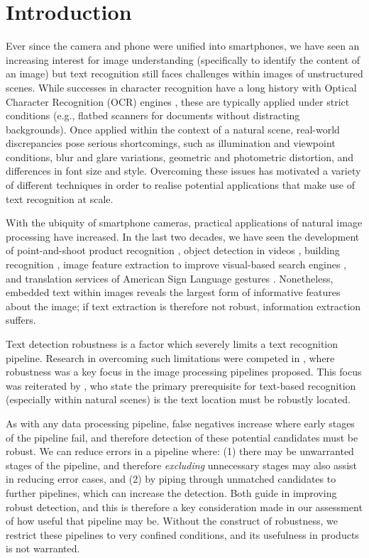 \chapter{Introduction}
\label{ch:introduction}

Ever since the camera and phone were unified into smartphones, we have seen an increasing interest for image understanding (specifically to identify the content of an image) but text recognition still faces challenges within images of unstructured scenes. While successes in character recognition have a long history with Optical Character Recognition (OCR) engines \citep{Smith:1987tg}, these are typically applied under strict conditions (e.g., flatbed scanners for documents without distracting backgrounds). Once applied within the context of a natural scene, real-world discrepancies pose serious shortcomings, such as illumination and viewpoint conditions, blur and glare variations, geometric and photometric distortion, and differences in font size and style. Overcoming these issues has motivated a variety of different techniques in order to realise potential applications that make use of text recognition at scale. 

With the ubiquity of smartphone cameras, practical applications of natural image processing have increased. In the last two decades, we have seen the development of point-and-shoot product recognition \citep{Tsai:2010cn,Girod:2011gw}, object detection in videos \citep{Sivic:2003tj}, building recognition \citep{Takacs:2008cg}, image feature extraction to improve visual-based search engines \citep{Lowe:2004kp,Bay:2008ud}, and translation services of American Sign Language gestures \citep{Jin:2016jd}. Nonetheless, embedded text within images reveals the largest form of informative features about the image; if text extraction is therefore not robust, information extraction suffers.

Text detection robustness is a factor which severely limits a text recognition pipeline. Research in overcoming such limitations were competed in \citet{Lucas:2003iw}, where robustness was a key focus in the image processing pipelines proposed. This focus was reiterated by \citet{Chen:2011ul}, who state the primary prerequisite for text-based recognition (especially within natural scenes) is the text location must be robustly located.

As with any data processing pipeline, false negatives increase where early stages of the pipeline fail, and therefore detection of these potential candidates must be robust. We can reduce errors in a pipeline where: (1) there may be unwarranted stages of the pipeline, and therefore \textit{excluding} unnecessary stages may also assist in reducing error cases, and (2) by piping through unmatched candidates to further pipelines, which can increase the detection. Both guide in improving robust detection, and this is therefore a key consideration made in our assessment of how useful that pipeline may be. Without the construct of robustness, we restrict these pipelines to very confined conditions, and its usefulness in products is not warranted.

